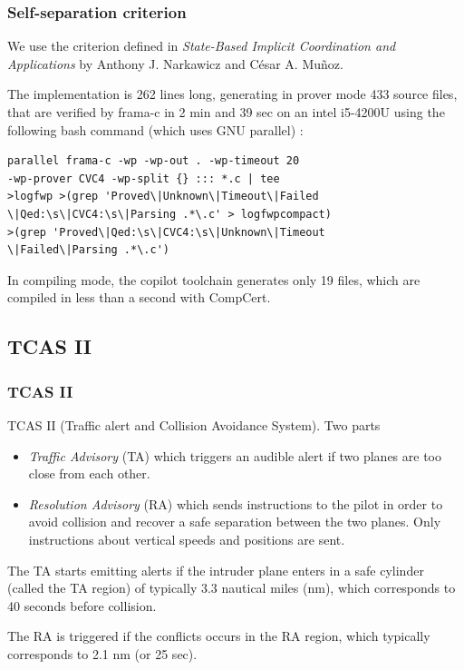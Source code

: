 \documentclass{beamer}
\begin{document}
\begin{frame}[fragile]
	\frametitle{Self-separation criterion}
	We use the criterion defined in \textit{State-Based Implicit Coordination
	and Applications} by Anthony J. Narkawicz and C\'esar A. Mu\~{n}oz.

	The implementation is 262 lines long, generating in prover mode 433 source files, that are verified by frama-c in 2 min and 39 sec on an intel i5-4200U using the following bash command (which uses GNU parallel) : 
\begin{lstlisting}
parallel frama-c -wp -wp-out . -wp-timeout 20 
-wp-prover CVC4 -wp-split {} ::: *.c | tee 
>logfwp >(grep 'Proved\|Unknown\|Timeout\|Failed
\|Qed:\s\|CVC4:\s\|Parsing .*\.c' > logfwpcompact) 
>(grep 'Proved\|Qed:\s\|CVC4:\s\|Unknown\|Timeout
\|Failed\|Parsing .*\.c')
\end{lstlisting}
	
	In compiling mode, the copilot toolchain generates only 19 files, which are compiled in less than a second with CompCert.
\end{frame}


\subsection{TCAS II}
\begin{frame}
	\tableofcontents[currentsubsection,sectionstyle=show/shaded,subsectionstyle=show/shaded/hide]
\end{frame}

\begin{frame}[fragile]
	\frametitle{TCAS II}
	TCAS II (Traffic alert and Collision Avoidance System). Two parts 
	\begin{itemize}
		\item \emph{Traffic Advisory} (TA) which triggers an audible alert if two planes are too close from each other.
		\item \emph{Resolution Advisory} (RA) which sends instructions to the pilot in order to avoid collision and recover a safe separation between the two planes. Only instructions about vertical speeds and positions are sent.
	\end{itemize}
	
	The TA starts emitting alerts if the intruder plane enters in a safe cylinder (called the TA region) of typically 3.3 nautical miles (nm), which corresponds to 40 seconds before collision. 
	
	The RA is triggered if the conflicts occurs in the RA region, which typically corresponds to 2.1 nm (or 25 sec).  
\end{frame}
\end{document}
